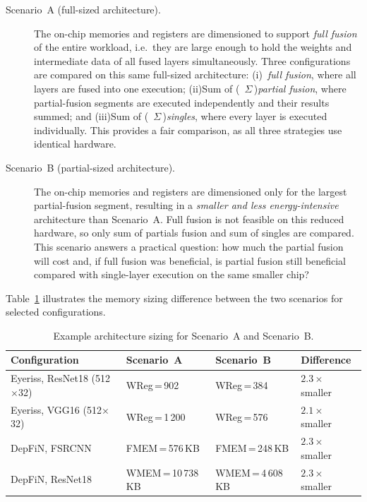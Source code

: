 \begin{description}
  \item[Scenario~A (full-sized architecture).]
    The on-chip memories and registers are dimensioned to support
    \emph{full fusion} of the entire workload, i.e.\ they are large
    enough to hold the weights and intermediate data of all fused layers
    simultaneously.
    Three configurations are compared on this same full-sized
    architecture:
    (i)~\emph{full fusion}, where all layers are fused into one
    execution;
    (ii)Sum of (~$\Sigma$\,)\emph{partial fusion}, where partial-fusion
    segments are executed independently and their results summed; and
    (iii)Sum of (~$\Sigma$\,)\emph{singles}, where every layer is executed
    individually.
    This provides a fair comparison, as all three strategies use
    identical hardware.

  \item[Scenario~B (partial-sized architecture).]
    The on-chip memories and registers are dimensioned only for the
    largest partial-fusion segment, resulting in a \emph{smaller and
    less energy-intensive} architecture than Scenario~A.
    Full fusion is not feasible on this reduced hardware, so only
   sum of partials fusion and sum of singles are compared.
    This scenario answers a practical question: how much the partial fusion will cost and,
    if full fusion was beneficial, is
    partial fusion still beneficial compared with single-layer
    execution on the same smaller chip?
\end{description}

\noindent
Table~\ref{tab:scenarios-example} illustrates the memory sizing
difference between the two scenarios for selected configurations.

\begin{table}[htbp]
  \centering
  \caption{Example architecture sizing for Scenario~A and Scenario~B.}
  \label{tab:scenarios-example}
  \small
  \begin{tabular}{l l l l}
    \toprule
    \textbf{Configuration}
      & \textbf{Scenario~A}
      & \textbf{Scenario~B}
      & \textbf{Difference} \\
    \midrule
    Eyeriss, ResNet18 (512$\times$32)
      & WReg\,=\,902
      & WReg\,=\,384
      & $2.3\times$ smaller \\
    Eyeriss, VGG16 (512$\times$32)
      & WReg\,=\,1\,200
      & WReg\,=\,576
      & $2.1\times$ smaller \\
    DepFiN, FSRCNN
      & FMEM\,=\,576\,KB
      & FMEM\,=\,248\,KB
      & $2.3\times$ smaller \\
    DepFiN, ResNet18
      & WMEM\,=\,10\,738\,KB
      & WMEM\,=\,4\,608\,KB
      & $2.3\times$ smaller \\
    \bottomrule
  \end{tabular}
\end{table}


